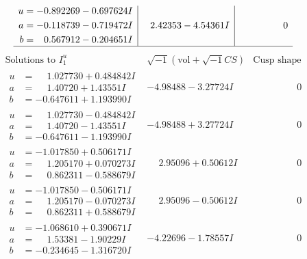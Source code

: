 \documentclass[1p]{elsarticle_modified}
\theoremstyle{definition}
\newcommand{\I}{\sqrt{-1}}
\begin{document}
$$\begin{array}{c|c|c}
\begin{aligned}
u &= -0.892269 - 0.697624 I \\
a &= -0.118739 - 0.719472 I \\
b &= \phantom{-}0.567912 - 0.204651 I\end{aligned}
 & \phantom{-}2.42353 - 4.54361 I & \phantom{-0.000000 } 0\\
 \hline 
 \end{array}$$\newpage$$\begin{array}{c|c|c}  
\text{Solutions to }I^u_{1}& \I (\text{vol} + \sqrt{-1}CS) & \text{Cusp shape}\\
 \hline 
\begin{aligned}
u &= \phantom{-}1.027730 + 0.484842 I \\
a &= \phantom{-}1.40720 + 1.43551 I \\
b &= -0.647611 + 1.193990 I\end{aligned}
 & -4.98488 - 3.27724 I & \phantom{-0.000000 } 0 \\ \hline\begin{aligned}
u &= \phantom{-}1.027730 - 0.484842 I \\
a &= \phantom{-}1.40720 - 1.43551 I \\
b &= -0.647611 - 1.193990 I\end{aligned}
 & -4.98488 + 3.27724 I & \phantom{-0.000000 } 0 \\ \hline\begin{aligned}
u &= -1.017850 + 0.506171 I \\
a &= \phantom{-}1.205170 + 0.070273 I \\
b &= \phantom{-}0.862311 - 0.588679 I\end{aligned}
 & \phantom{-}2.95096 + 0.50612 I & \phantom{-0.000000 } 0 \\ \hline\begin{aligned}
u &= -1.017850 - 0.506171 I \\
a &= \phantom{-}1.205170 - 0.070273 I \\
b &= \phantom{-}0.862311 + 0.588679 I\end{aligned}
 & \phantom{-}2.95096 - 0.50612 I & \phantom{-0.000000 } 0 \\ \hline\begin{aligned}
u &= -1.068610 + 0.390671 I \\
a &= \phantom{-}1.53381 - 1.90229 I \\
b &= -0.234645 - 1.316720 I\end{aligned}
 & -4.22696 - 1.78557 I & \phantom{-0.000000 } 0 \\ \hline\begin{aligned}

\end{aligned}
\end{array}$$
\end{document}
